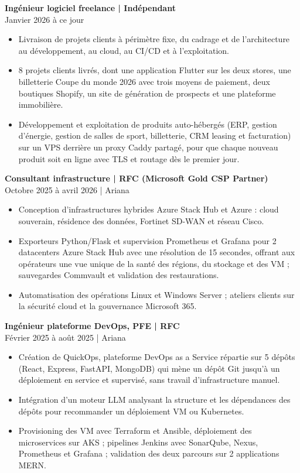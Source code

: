 \documentclass[11pt,a4paper]{article}
\newcommand{\role}[3]{\Needspace{5\baselineskip}\textbf{#1 | #2}\\#3\par}
\begin{document}
\role{Ingénieur logiciel freelance}{Indépendant}{Janvier 2026 à ce jour}
\begin{itemize}
\item Livraison de projets clients à périmètre fixe, du cadrage et de l'architecture au développement, au cloud, au CI/CD et à l'exploitation.
\item 8 projets clients livrés, dont une application Flutter sur les deux stores, une billetterie Coupe du monde 2026 avec trois moyens de paiement, deux boutiques Shopify{}, un site de génération de prospects et une plateforme immobilière.
\item Développement et exploitation de produits auto-hébergés (ERP, gestion d'énergie, gestion de salles de sport, billetterie, CRM leasing et facturation) sur un VPS derrière un proxy Caddy partagé, pour que chaque nouveau produit soit en ligne avec TLS et routage dès le premier jour.
\end{itemize}

\role{Consultant infrastructure}{RFC (Microsoft Gold CSP Partner)}{Octobre 2025 à avril 2026 | Ariana}
\begin{itemize}
\item Conception d'infrastructures hybrides Azure Stack Hub et Azure : cloud souverain, résidence des données, Fortinet SD-WAN et réseau Cisco.
\item Exporteurs Python/Flask et supervision Prometheus et Grafana pour 2 datacenters Azure Stack Hub avec une résolution de 15 secondes, offrant aux opérateurs une vue unique de la santé des régions, du stockage et des VM ; sauvegardes Commvault et validation des restaurations.
\item Automatisation des opérations Linux et Windows Server ; ateliers clients sur la sécurité cloud et la gouvernance Microsoft 365.
\end{itemize}

\role{Ingénieur plateforme DevOps, PFE}{RFC}{Février 2025 à août 2025 | Ariana}
\begin{itemize}
\item Création de QuickOps, plateforme DevOps as a Service répartie sur 5 dépôts (React, Express, FastAPI, MongoDB) qui mène un dépôt Git jusqu'à un déploiement en service et supervisé, sans travail d'infrastructure manuel.
\item Intégration d'un moteur LLM analysant la structure et les dépendances des dépôts pour recommander un déploiement VM ou Kubernetes.
\item Provisioning des VM avec Terraform et Ansible, déploiement des microservices sur AKS ; pipelines Jenkins avec SonarQube, Nexus, Prometheus et Grafana ; validation des deux parcours sur 2 applications MERN.
\end{itemize}
\end{document}
